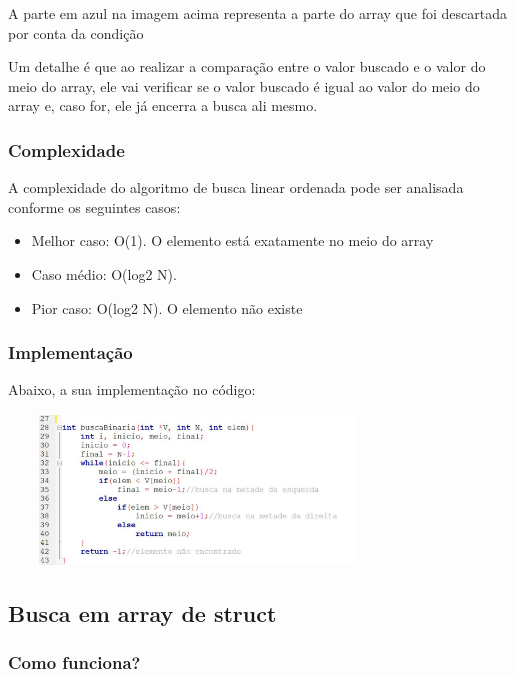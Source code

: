 \documentclass{report}
\begin{document}
	A parte em azul na imagem acima representa a parte do array que foi descartada por conta da condição
	
	
	Um detalhe é que ao realizar a comparação entre o valor buscado e o valor do meio do array, ele vai verificar se o valor buscado é igual ao valor do meio do array e, caso for, ele já encerra a busca ali mesmo.
	
	\subsubsection{Complexidade}
	
	A complexidade do algoritmo de busca linear ordenada pode ser analisada conforme os seguintes casos:
	
	\begin{itemize}
		\item Melhor caso: O(1). O elemento está exatamente no meio do array
		\item Caso médio: O(log2 N). 
		\item Pior caso: O(log2 N). O elemento não existe
	\end{itemize}
	
	\subsubsection{Implementação}
	
	Abaixo, a sua implementação no código:
	
	\begin{center}
		
		\includegraphics[width=10cm,height=4cm,keepaspectratio=false]{imagens/bbinariafunc.png}
		
	\end{center}
	
	\subsection{Busca em array de struct}
	\subsubsection{Como funciona?}
	
\end{document}
